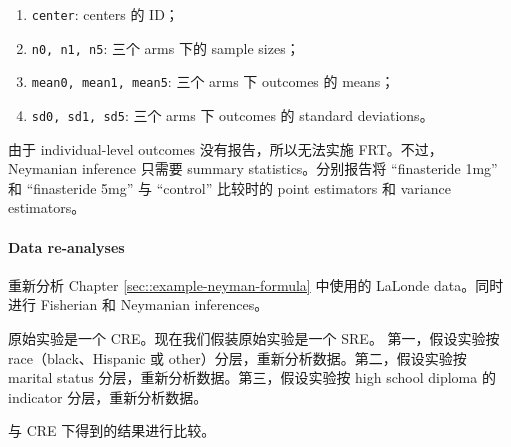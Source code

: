 \begin{enumerate}
\item
\texttt{center}: centers 的 ID；
\item
\texttt{n0, n1, n5}: 三个 arms 下的 sample sizes；
\item
\texttt{mean0, mean1, mean5}: 三个 arms 下 outcomes 的 means；
\item
\texttt{sd0, sd1, sd5}: 三个 arms 下 outcomes 的 standard deviations。
\end{enumerate}

由于 individual-level outcomes 没有报告，所以无法实施 FRT。不过，Neymanian inference 只需要 summary statistics。分别报告将 ``finasteride 1mg'' 和 ``finasteride 5mg'' 与 ``control'' 比较时的 point estimators 和 variance estimators。


\paragraph{Data re-analyses}
 
 
重新分析 Chapter \ref{sec::example-neyman-formula} 中使用的 LaLonde data。同时进行 Fisherian 和 Neymanian inferences。

原始实验是一个 CRE。现在我们假装原始实验是一个 SRE。
第一，假设实验按 race（black、Hispanic 或 other）分层，重新分析数据。第二，假设实验按 marital status 分层，重新分析数据。第三，假设实验按 high school diploma 的 indicator 分层，重新分析数据。

与 CRE 下得到的结果进行比较。

 

